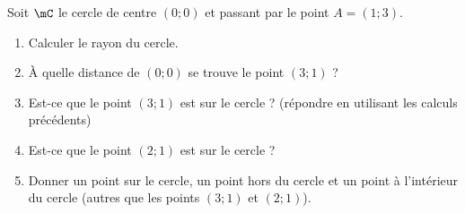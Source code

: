 
\begin{exercice}\label{exoSeconde-0079}

Soit \( \mC\) le cercle de centre \( (0;0)\) et passant par le point \( A=(1;3)\).
\begin{multicols}{2}
    \begin{enumerate}
        \item
            Calculer le rayon du cercle.
        \item
            À quelle distance de \( (0;0)\) se trouve le point \( (3;1)\) ?
        \item
            Est-ce que le point \( (3;1)\) est sur le cercle ? (répondre en utilisant les calculs précédents)
        \item
            Est-ce que le point \( (2;1)\) est sur le cercle ?
        \item
            Donner un point sur le cercle, un point hors du cercle et un point à l'intérieur du cercle (autres que les points \( (3;1)\) et \( (2;1)\)).
    \end{enumerate}
\end{multicols}

\end{exercice}
